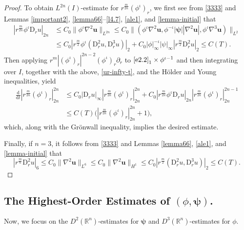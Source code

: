 \documentclass[11pt,reqno]{amsart}
\numberwithin{rk}{section}
\numberwithin{prop}{section}
\numberwithin{mydef}{section}
\numberwithin{lem}{section}
\numberwithin{equation}{section}
\numberwithin{thm}{section}
\begin{document}
\begin{proof}
To obtain $L^{2n}(I)$-estimate for $r^\frac{m}{2n}(\phi^\iota)_r$, we first see from \eqref{3333} and Lemmas \ref{important2}, \ref{lemma66}--\ref{l4.7}, \ref{ale1}, and \ref{lemma-initial} that
\begin{equation*}
\begin{aligned}
|r^\frac{m}{2n}\phi^\iota \mathrm{D}_r u|_{2n}&\leq C_0\|\phi^\iota\nabla^2\boldsymbol{u}\|_{L^{2n}}\leq C_0\|(\phi^\iota\nabla^2\boldsymbol{u},\phi^{-\iota}|\boldsymbol{\psi}||\nabla^2\boldsymbol{u}|,\phi^\iota\nabla^3\boldsymbol{u})\|_{L^2}\\
&\leq C_0|r^\frac{m}{2}\phi^\iota(\mathrm{D}_r^2u,\mathrm{D}_r^3u)|_{2}+C_0|\phi|_\infty^{-\iota}|\psi|_\infty|r^\frac{m}{2}\mathrm{D}_r^2u|_{2}\leq C(T).  
\end{aligned}
\end{equation*}
Then applying $r^m|(\phi^\iota)_r|^{2n-2}(\phi^\iota)_r\partial_r$ to $\eqref{e2.2}_1\times \phi^{\iota-1}$ and then integrating over $I$, together with the above, \eqref{ur-infty-t}, and the H\"older and Young inequalities, yield
\begin{equation*}
\begin{aligned}
\frac{\mathrm{d}}{\mathrm{d}t}|r^\frac{m}{2n}(\phi^\iota)_r|_{2n}^{2n}&\leq C_0|\mathrm{D}_r u|_\infty|r^\frac{m}{2n}(\phi^\iota)_r|_{2n}^{2n}+C_0|r^\frac{m}{2n}\phi^\iota \mathrm{D}_r u|_{2n}|r^\frac{m}{2n}(\phi^\iota)_r|_{2n}^{2n-1}\\
&\leq C(T)\big(|r^\frac{m}{2n}(\phi^\iota)_r|_{2n}^{2n}+1\big),
\end{aligned}
\end{equation*}
which, along with the Gr\"onwall inequality, implies the desired estimate.

Finally, if $n=3$, it follows from \eqref{3333} and Lemmas \ref{lemma66}, \ref{ale1}, and \ref{lemma-initial} that
\begin{equation*}
|r^\frac{m}{6}\mathrm{D}_r^2 u|_{6}\leq C_0\|\nabla^2\boldsymbol{u}\|_{L^{6}}\leq C_0\|\nabla^2\boldsymbol{u}\|_{H^1}\leq C_0|r^\frac{m}{2}(\mathrm{D}_r^2 u,\mathrm{D}_r^3 u)|_{2}\leq C(T).
\end{equation*}
\end{proof}





\subsection{The Highest-Order Estimates of $(\phi,\boldsymbol{\psi})$.}
Now, we focus on the $D^2(\mathbb{R}^n)$-estimates for $\boldsymbol{\psi}$ and  $D^3(\mathbb{R}^n)$-estimates for $\phi$.  
\end{document}
